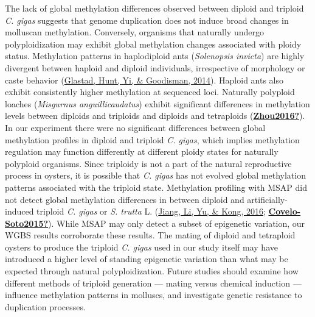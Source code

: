 \documentclass [11pt, proquest] {uwthesis}[2015/03/03]
\begin{document}
The lack of global methylation differences observed between diploid and triploid \emph{C. gigas} suggests that genome duplication does not induce broad changes in molluscan methylation. Conversely, organisms that naturally undergo polyploidization may exhibit global methylation changes associated with ploidy status. Methylation patterns in haplodiploid ants (\emph{Solenopsis invicta}) are highly divergent between haploid and diploid individuals, irrespective of morphology or caste behavior (\protect\hyperlink{ref-Glastad2014}{Glastad, Hunt, Yi, \& Goodisman, 2014}). Haploid ants also exhibit consistently higher methylation at sequenced loci. Naturally polyploid loaches (\emph{Misgurnus anguillicaudatus}) exhibit significant differences in methylation levels between diploids and triploids and diploids and tetraploids (\protect\hyperlink{ref-Zhou2016}{\textbf{Zhou2016?}}). In our experiment there were no significant differences between global methylation profiles in diploid and triploid \emph{C. gigas}, which implies methylation regulation may function differently at different ploidy states for naturally polyploid organisms. Since triploidy is not a part of the natural reproductive process in oysters, it is possible that \emph{C. gigas} has not evolved global methylation patterns associated with the triploid state. Methylation profiling with MSAP did not detect global methylation differences in between diploid and artificially-induced triploid \emph{C. gigas} or \emph{S. trutta} L. (\protect\hyperlink{ref-Jiang2016}{Jiang, Li, Yu, \& Kong, 2016}; \protect\hyperlink{ref-Covelo-Soto2015}{\textbf{Covelo-Soto2015?}}). While MSAP may only detect a subset of epigenetic variation, our WGBS results corroborate these results. The mating of diploid and tetraploid oysters to produce the triploid \emph{C. gigas} used in our study itself may have introduced a higher level of standing epigenetic variation than what may be expected through natural polyploidization. Future studies should examine how different methods of triploid generation --- mating versus chemical induction --- influence methylation patterns in molluscs, and investigate genetic resistance to duplication processes.
\end{document}
